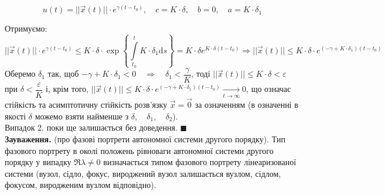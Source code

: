 \documentclass[14pt,a4paper]{scrartcl}
\theoremstyle{definition}
\theoremstyle{definition}
\theoremstyle{definition}
\begin{document}
$$ u(t) = ||\overrightarrow{x}(t)|| \cdot e^{\gamma(t - t_0)}, \quad c = K \cdot \delta, \quad b = 0, \quad a = K \cdot \delta_1$$

Отримуємо: $$||\overrightarrow{x}(t)|| \cdot e^{\gamma(t - t_0)} \leq K \cdot \delta \cdot \exp \left\lbrace {\int\limits_{t_0}^{t} K \cdot \delta_1 \mathrm{d}s} \right\rbrace = K \cdot \delta e^{K \cdot \delta (t - t_0)} \Longrightarrow ||\overrightarrow{x}(t)|| \leq K \cdot \delta \cdot e^{(-\gamma + K \cdot \delta_1)(t - t_0)}$$ Оберемо $\delta_1$ так, щоб $-\gamma + K \cdot \delta_1 < 0 \quad \Longrightarrow \quad \delta_1 < \dfrac{\gamma}{K}$, тоді $||\overrightarrow{x}(t)|| \leq K \cdot \delta < \varepsilon$ при $\delta < \dfrac{\varepsilon}{K}$ і, крім того, $||\overrightarrow{x}(t)|| \leq K \cdot \delta \cdot e^{(-\gamma + K \cdot \delta_1)(t - t_0)} \xrightarrow[t \to \infty]{} 0$, що означає стійкість та асимптотичну стійкість розв'язку $\overrightarrow{x} = \overrightarrow{0}$ за означенням (в означенні в якості $\delta$ можемо взяти найменше з $\delta, \quad \delta_1, \quad \delta_2$).\\ Випадок 2. поки ще залишається без доведення. $\blacksquare$ \\
\textbf{Зауваження.} (про фазові портрети автономної системи другого порядку). Тип фазового портрету в околі положень рівноваги автономної системи другого порядку у випадку $\Re \lambda \neq 0$ визначається типом фазового портрету лінеаризованої системи (вузол, сідло, фокус, вироджений вузол залишається вузлом, сідлом, фокусом, виродженим вузлом відповідно).

%
\end{document}
